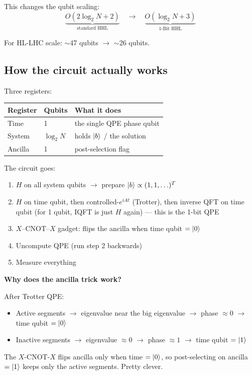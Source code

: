 \documentclass[11pt, a4paper]{article}
\begin{document}
This changes the qubit scaling:
\[
  \underbrace{O(2\log_2 N + 2)}_{\text{standard HHL}}
  \quad\longrightarrow\quad
  \underbrace{O(\log_2 N + 3)}_{\text{1-Bit HHL}}
\]

For HL-LHC scale: $\sim$47 qubits $\to$ $\sim$26 qubits.

\subsection{How the circuit actually works}

Three registers:

\begin{center}
\begin{tabular}{lll}
\toprule
Register & Qubits & What it does \\
\midrule
Time    & 1             & the single QPE phase qubit \\
System  & $\log_2 N$    & holds $\ket{b}$ / the solution \\
Ancilla & 1             & post-selection flag \\
\bottomrule
\end{tabular}
\end{center}

\medskip
The circuit goes:

\begin{enumerate}
  \item $H$ on all system qubits $\to$ prepare $\ket{b} \propto
        (1,1,\ldots)^T$
  \item $H$ on time qubit, then controlled-$e^{iAt}$ (Trotter), then
        inverse QFT on time qubit (for 1 qubit, IQFT is just $H$ again)
        --- this is the 1-bit QPE
  \item $X$--CNOT--$X$ gadget: flips the ancilla when time qubit $=
        \ket{0}$
  \item Uncompute QPE (run step 2 backwards)
  \item Measure everything
\end{enumerate}

\begin{tcolorbox}[nb]
\textbf{Why does the ancilla trick work?}

After Trotter QPE:
\begin{itemize}
  \item Active segments $\to$ eigenvalue near the big eigenvalue $\to$
        phase $\approx 0$ $\to$ time qubit $= \ket{0}$
  \item Inactive segments $\to$ eigenvalue $\approx 0$ $\to$ phase
        $\approx 1$ $\to$ time qubit $= \ket{1}$
\end{itemize}
The $X$-CNOT-$X$ flips ancilla only when time $= \ket{0}$, so
post-selecting on ancilla $= \ket{1}$ keeps only the active segments.
Pretty clever.
\end{tcolorbox}
\end{document}
